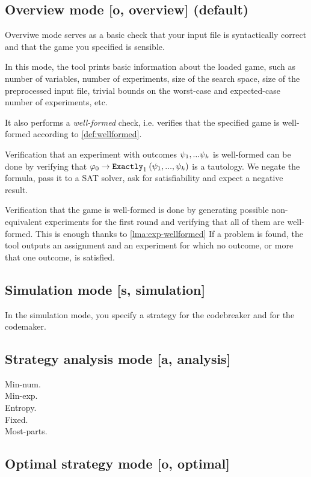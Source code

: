 \subsection{Overview mode [o, overview] (default)}

Overviwe mode serves as a basic check that your input file is
  syntactically correct and that the game you specified is sensible.

In this mode, the tool prints basic information about the loaded game, such as
  number of variables, number of experiments, size of the search space,
  size of the preprocessed input file,
  trivial bounds on the worst-case and expected-case number of experiments, etc.

It also performs a \emph{well-formed} check, i.e. verifies that the
  specified game is well-formed according to \autoref{def:wellformed}.

Verification that an experiment with outcomes $\psi_1,...\psi_k$ is well-formed
  can be done by verifying that $\varphi_0->\mathtt{Exactly}_{1}\:(\psi_1, ..., \psi_k)$
  is a tautology.
We negate the formula, pass it to a SAT solver, ask for satisfiability and expect a negative result.

Verification that the game is well-formed is done by
  generating possible non-equivalent experiments for the first round
  and verifying that all of them are well-formed.
This is enough thanks to \autoref{lma:exp-wellformed}
If a problem is found, the tool outputs an assignment and an experiment
  for which no outcome, or more that one outcome, is satisfied.

\subsection{Simulation mode [s, simulation]}
In the simulation mode, you specify a strategy for
  the codebreaker and for the codemaker.

\subsection{Strategy analysis mode [a, analysis]}
\begin{description}
\item[Min-num.]
\item[Min-exp.]
\item[Entropy.]
\item[Fixed.]
\item[Most-parts.]
\end{description}

\subsection{Optimal strategy mode [o, optimal]}

